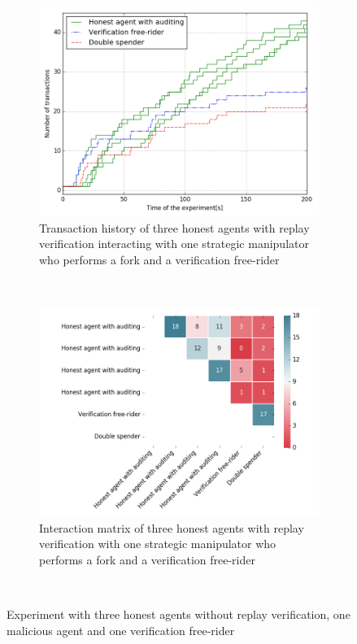\begin{figure}[h!]
    \begin{subfigure}{\textwidth}
      \centering
      \includegraphics[width=.7\linewidth]{images/verification_doublespending}
      \caption{Transaction history of three honest agents with replay verification interacting with one strategic manipulator who performs a fork and a verification free-rider}
      \label{fig:verification_doublespending}
    \end{subfigure}\\
    \begin{subfigure}{\textwidth}
      \centering
      \includegraphics[width=.8\linewidth]{images/verification_doublespending_matrix}
      \caption{Interaction matrix of three honest agents with replay verification with one strategic manipulator who performs a fork and a verification free-rider}
      \label{fig:verification_doublespending_matrix}
    \end{subfigure}\\
    \caption{Experiment with three honest agents without replay verification, one malicious agent 
    and one verification free-rider}
    \label{fig:verification_doublespend_combined}
\end{figure}

